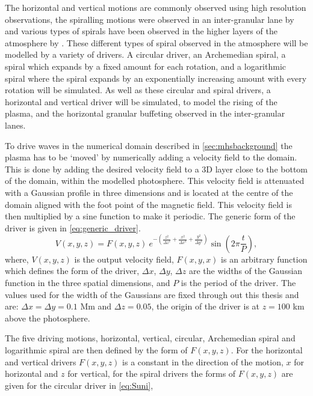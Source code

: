 The horizontal and vertical motions are commonly observed using high resolution observations, the spiralling motions were observed in an inter-granular lane by \cite{bonet2008, bonet2010} and various types of spirals have been observed in the higher layers of the atmosphere by \cite{wedemeyer-bohm2009,wedemeyer-bohm2012,wedemeyer2013}.
These different types of spiral observed in the atmosphere will be modelled by a variety of drivers.
A circular driver, an Archemedian spiral, a spiral which expands by a fixed amount for each rotation, and a logarithmic spiral where the spiral expands by an exponentially increasing amount with every rotation will be simulated.
As well as these circular and spiral drivers, a horizontal and vertical driver will be simulated, to model the rising of the plasma, and the horizontal granular buffeting observed in the inter-granular lanes.

To drive waves in the numerical domain described in \cref{sec:mhsbackground} the plasma has to be `moved' by numerically adding a velocity field to the domain.
This is done by adding the desired velocity field to a 3D layer close to the bottom of the domain, within the modelled photosphere.
This velocity field is attenuated with a Gaussian profile in three dimensions and is located at the centre of the domain aligned with the foot point of the magnetic field.
This velocity field is then multiplied by a sine function to make it periodic. The generic form of the driver is given in \cref{eq:generic_driver}.
\begin{equation}
	V(x,y,z) = F(x,y,z) \ e^{-\left(\frac{z^2}{\Delta z^2} + \frac{x^2}{\Delta x^2} + \frac{y^2}{\Delta y^2}\right)} \sin \left(2\pi \frac{t}{P}\right),
	\label{eq:generic_driver}
\end{equation}
where, $V(x,y,z)$ is the output velocity field, $F(x,y,x)$ is an arbitrary function which defines the form of the driver, $\Delta x$, $\Delta y$, $\Delta z$ are the widths of the Gaussian function in the three spatial dimensions, and $P$ is the period of the driver.
The values used for the width of the Gaussians are fixed through out this thesis and are: $\Delta x = \Delta y = 0.1$ Mm and $\Delta z = 0.05$, the origin of the driver is at $z = 100$ km above the photosphere.

The five driving motions, horizontal, vertical, circular, Archemedian spiral and logarithmic spiral are then defined by the form of $F(x,y,z)$. For the horizontal and vertical drivers $F(x,y,z)$ is a constant in the direction of the motion, $x$ for horizontal and $z$ for vertical, for the spiral drivers the forms of $F(x,y,z)$ are given for the circular driver in \cref{eq:Suni},

